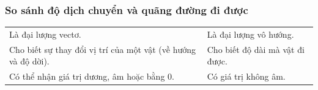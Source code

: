 \subsubsection{So sánh độ dịch chuyển và quãng đường đi được}
\begin{longtable}{|m{20em}|m{20em}|}
	\hline
	\thead{Độ dịch chuyển $\left(\vec{d}\right)$} & \thead{Quãng đường $\left(s\right)$}\\
	\hline
	Là đại lượng vectơ. & Là đại lượng vô hướng.\\
	\hline
	Cho biết sự thay đổi vị trí của một vật (về hướng và độ dời). & Cho biết độ dài mà vật đi được.\\
	\hline
	Có thể nhận giá trị dương, âm hoặc bằng 0. & Có giá trị không âm.\\
	\hline
\end{longtable}
